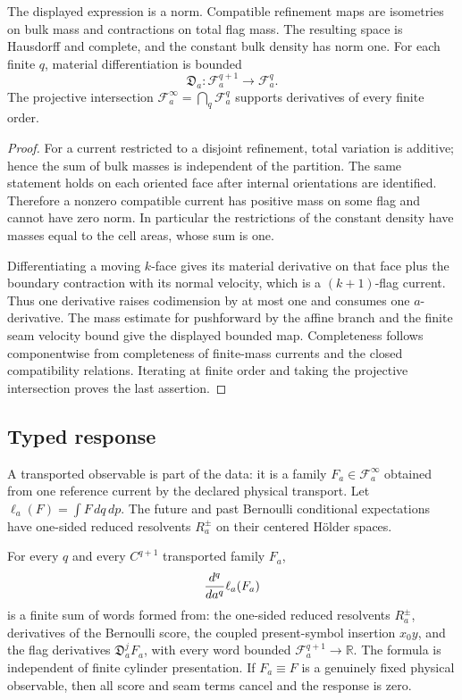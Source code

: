 \begin{proposition}
\label{prop:r14-a1-flag}
The displayed expression is a norm.  Compatible refinement maps are
isometries on bulk mass and contractions on total flag mass.  The resulting
space is Hausdorff and complete, and the constant bulk density has norm one.
For each finite \(q\), material differentiation is bounded
\[
 \mathfrak D_a:\mathscr F_a^{q+1}\longrightarrow\mathscr F_a^q.
\]
The projective intersection
\(\mathscr F_a^\infty=\bigcap_q\mathscr F_a^q\) supports derivatives of every
finite order.
\end{proposition}

\begin{proof}
For a current restricted to a disjoint refinement, total variation is
additive; hence the sum of bulk masses is independent of the partition.  The
same statement holds on each oriented face after internal orientations are
identified.  Therefore a nonzero compatible current has positive mass on
some flag and cannot have zero norm.  In particular the restrictions of the
constant density have masses equal to the cell areas, whose sum is one.

Differentiating a moving \(k\)-face gives its material derivative on that face
plus the boundary contraction with its normal velocity, which is a
\((k+1)\)-flag current.  Thus one derivative raises codimension by at most one
and consumes one \(a\)-derivative.  The mass estimate for pushforward by the
affine branch and the finite seam velocity bound give the displayed bounded
map.  Completeness follows componentwise from completeness of finite-mass
currents and the closed compatibility relations.  Iterating at finite order
and taking the projective intersection proves the last assertion.
\end{proof}

\subsection{Typed response}

A transported observable is part of the data: it is a family
\(F_a\in\mathscr F_a^\infty\) obtained from one reference current by the
declared physical transport.  Let \(\ell_a(F)=\int F\,dq\,dp\).
The future and past Bernoulli conditional expectations have one-sided
reduced resolvents \(R_a^\pm\) on their centered Hölder spaces.

\begin{theorem}
\label{thm:r14-a1-response}
For every \(q\) and every \(C^{q+1}\) transported family \(F_a\),
\[
 {d^q\over da^q}\ell_a(F_a)
\]
is a finite sum of words formed from: the one-sided reduced resolvents
\(R_a^\pm\), derivatives of the Bernoulli score, the coupled present-symbol
insertion \(x_0y\), and the flag derivatives
\(\mathfrak D_a^jF_a\), with every word bounded
\(\mathscr F_a^{q+1}\to\mathbb R\).  The formula is independent of finite
cylinder presentation.  If \(F_a\equiv F\) is a genuinely fixed physical
observable, then all score and seam terms cancel and the response is zero.
\end{theorem}

